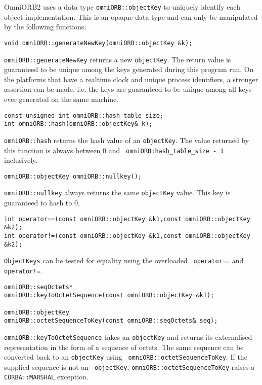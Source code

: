 \documentclass[11pt,twoside,onecolumn]{book}
\begin{document}
OmniORB2 uses a data type {\tt omniORB::objectKey} to uniquely
identify each object implementation. This is an opaque data type and 
can only be manipulated by the following functions:

{\small
\begin{verbatim}
void omniORB::generateNewKey(omniORB::objectKey &k);
\end{verbatim}
}

{\tt omniORB::generateNewKey} returns a new {\tt objectKey}. The return
value is guaranteed to be unique among the keys generated during this program
run. On the platforms that have a realtime clock and unique process
identifiers, a stronger assertion can be made, i.e. the keys are guaranteed
to be unique among all keys ever generated on the same machine.

{\small
\begin{verbatim}
const unsigned int omniORB::hash_table_size;
int omniORB::hash(omniORB::objectKey& k);
\end{verbatim}
}

{\tt omniORB::hash} returns the hash value of an {\tt objectKey}. The value
returned by this function is always between 0 and {\tt
omniORB:hash\_table\_size - 1} inclusively.

{\small
\begin{verbatim}
omniORB::objectKey omniORB::nullkey();
\end{verbatim}
}

{\tt omniORB::nullkey} always returns the same {\tt objectKey} value. This
key is guaranteed to hash to 0.

{\small
\begin{verbatim}
int operator==(const omniORB::objectKey &k1,const omniORB::objectKey &k2);
int operator!=(const omniORB::objectKey &k1,const omniORB::objectKey &k2);
\end{verbatim}
}

{\tt ObjectKeys} can be tested for equality using the overloaded {\tt
operator==} and {\tt operator!=}.

{\small
\begin{verbatim}
omniORB::seqOctets*
omniORB::keyToOctetSequence(const omniORB::objectKey &k1);

omniORB::objectKey
omniORB::octetSequenceToKey(const omniORB::seqOctets& seq);
\end{verbatim}
}

{\tt omniORB::keyToOctetSequence} takes an {\tt objectKey} and returns its
externalised representation in the form of a sequence of octets. The same
sequence can be converted back to an {\tt objectKey} using {\tt
omniORB::octetSequenceToKey}. If the supplied sequence is not an {\tt
objectKey}, {\tt omniORB::octetSequenceToKey} raises a {\tt CORBA::MARSHAL}
exception.
\end{document}

